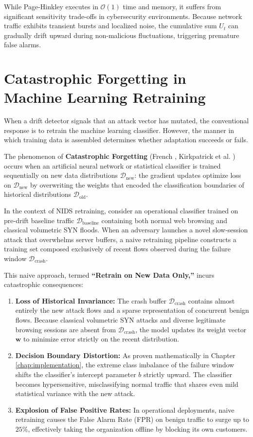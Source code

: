 \documentclass[12pt,a4paper,oneside]{report}
\begin{document}
While Page-Hinkley executes in $\mathcal{O}(1)$ time and memory, it suffers from significant sensitivity trade-offs in cybersecurity environments. Because network traffic exhibits transient bursts and localized noise, the cumulative sum $U_t$ can gradually drift upward during non-malicious fluctuations, triggering premature false alarms.

\section{Catastrophic Forgetting in Machine Learning Retraining}
When a drift detector signals that an attack vector has mutated, the conventional response is to retrain the machine learning classifier. However, the manner in which training data is assembled determines whether adaptation succeeds or fails.

The phenomenon of \textbf{Catastrophic Forgetting} (French \cite{french1999}, Kirkpatrick et al. \cite{kirkpatrick2017}) occurs when an artificial neural network or statistical classifier is trained sequentially on new data distributions $\mathcal{D}_{\text{new}}$: the gradient updates optimize loss on $\mathcal{D}_{\text{new}}$ by overwriting the weights that encoded the classification boundaries of historical distributions $\mathcal{D}_{\text{old}}$.

In the context of NIDS retraining, consider an operational classifier trained on pre-drift baseline traffic $\mathcal{D}_{\text{baseline}}$ containing both normal web browsing and classical volumetric SYN floods. When an adversary launches a novel slow-session attack that overwhelms server buffers, a naive retraining pipeline constructs a training set composed exclusively of recent flows observed during the failure window $\mathcal{D}_{\text{crash}}$.

This naive approach, termed \textbf{``Retrain on New Data Only,''} incurs catastrophic consequences:
\begin{enumerate}
    \item \textbf{Loss of Historical Invariance:} The crash buffer $\mathcal{D}_{\text{crash}}$ contains almost entirely the new attack flows and a sparse representation of concurrent benign flows. Because classical volumetric SYN attacks and diverse legitimate browsing sessions are absent from $\mathcal{D}_{\text{crash}}$, the model updates its weight vector $\mathbf{w}$ to minimize error strictly on the recent distribution.
    \item \textbf{Decision Boundary Distortion:} As proven mathematically in Chapter \ref{chap:implementation}, the extreme class imbalance of the failure window shifts the classifier's intercept parameter $b$ strictly upward. The classifier becomes hypersensitive, misclassifying normal traffic that shares even mild statistical variance with the new attack.
    \item \textbf{Explosion of False Positive Rates:} In operational deployments, naive retraining causes the False Alarm Rate (FPR) on benign traffic to surge up to $25\%$, effectively taking the organization offline by blocking its own customers.
\end{enumerate}
\end{document}
